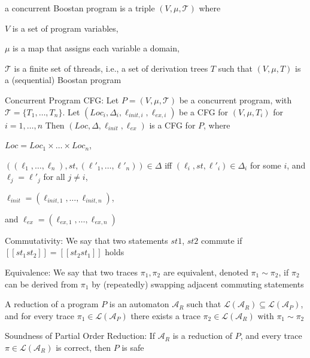 \documentclass[landscape, a4paper]{article}
\begin{document}
\begin{minipage}[t]{0.2\linewidth}
\begin{betterlist}
	\end{betterlist}
	\begin{betterlist}
		\item a \alert{ concurrent Boostan program}  is a triple $(V , \mu , \mathcal{T})$ where
		\begin{betterlist}
			\item $V$ is a set of program variables,
			\item $\mu$ is a map that assigns each variable a domain,
			\item $\mathcal{T}$ is a finite set of threads, i.e., a set of derivation trees $T$ such that $(V , \mu , T)$ is a (sequential) Boostan program
		\end{betterlist}
		\item \alert{Concurrent Program CFG:} Let $P = (V , \mu , \mathcal{T} )$ be a concurrent program, with $\mathcal{T} = \{ T_1,\ldots, T_n\}$. Let $(Loc_i, \Delta_i, \ell_{init,i}, \ell_{ex,i})$ be a CFG for $(V, \mu , T_i)$ for $i = 1, \ldots, n$
		Then $(Loc, \Delta, \ell_{init}, \ell_{ex})$ is a CFG for $P$, where
		\begin{betterlist}
			\item $Loc = Loc_1 \times \ldots \times Loc_n$,
			\item $((\ell_1,\ldots , \ell_n), st, (\ell'_1,\ldots , \ell'_n)) \in \Delta$ iff $(\ell_i, st, \ell'_i) \in \Delta_i$ for some $i$, and $\ell_j = \ell'_j$ for all $j \ne i$,
			\item $\ell_{init} = (\ell_{init,1},\ldots , \ell_{init,n})$,
			\item and $\ell_{ex} = (\ell_{ex,1},\ldots , \ell_{ex,n})$
		\end{betterlist}
		\item \alert{Commutativity:} We say that two statements $st1$, $st2$ \alert{commute} if $[[st_1 st_2]] = [[st_2 st_1]]$ holds
		\item \alert{Equivalence:} We say that two traces $\pi_1, \pi_2$ are \alert{equivalent}, denoted $\pi_1 \sim \pi_2$, if $\pi_2$ can be derived from $\pi_1$ by (repeatedly) swapping adjacent commuting statements
		\item A \alert{reduction} of a program $P$ is an automaton $\mathcal{A}_R$ such that $\mathcal{L}(\mathcal{A}_R) \subseteq \mathcal{L}(\mathcal{A}_P)$, and for every trace $\pi_1 \in \mathcal{L}(\mathcal{A}_P)$ there exists a trace $\pi_2 \in \mathcal{L}(\mathcal{A}_R)$ with $\pi_1 \sim \pi_2$
		\item \alert{Soundness of Partial Order Reduction:} If $\mathcal{A}_R$ is a reduction of $P$, and every trace $\pi \in \mathcal{L}(\mathcal{A}_R)$ is correct, then $P$ is safe
	\end{betterlist}
\end{minipage}
\end{document}
